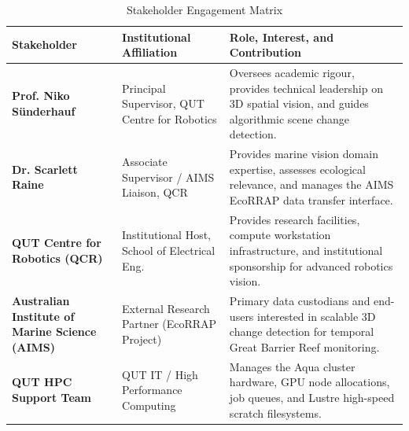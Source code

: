 \begin{table}[htbp]
\centering
\small
\renewcommand{\arraystretch}{1.2}
\caption{Stakeholder Engagement Matrix}
\label{tab:stakeholders}
\begin{tabularx}{\textwidth}{>{\bfseries}p{3.2cm} p{3.8cm} X}
\toprule
\textbf{Stakeholder} & \textbf{Institutional Affiliation} & \textbf{Role, Interest, and Contribution} \\
\midrule
Prof. Niko S{\"u}nderhauf & Principal Supervisor, QUT Centre for Robotics & Oversees academic rigour, provides technical leadership on 3D spatial vision, and guides algorithmic scene change detection. \\
\addlinespace
Dr. Scarlett Raine & Associate Supervisor / AIMS Liaison, QCR & Provides marine vision domain expertise, assesses ecological relevance, and manages the AIMS EcoRRAP data transfer interface. \\
\addlinespace
QUT Centre for Robotics (QCR) & Institutional Host, School of Electrical Eng. & Provides research facilities, compute workstation infrastructure, and institutional sponsorship for advanced robotics vision. \\
\addlinespace
Australian Institute of Marine Science (AIMS) & External Research Partner (EcoRRAP Project) & Primary data custodians and end-users interested in scalable 3D change detection for temporal Great Barrier Reef monitoring. \\
\addlinespace
QUT HPC Support Team & QUT IT / High Performance Computing & Manages the Aqua cluster hardware, GPU node allocations, job queues, and Lustre high-speed scratch filesystems. \\
\bottomrule
\end{tabularx}
\end{table}
